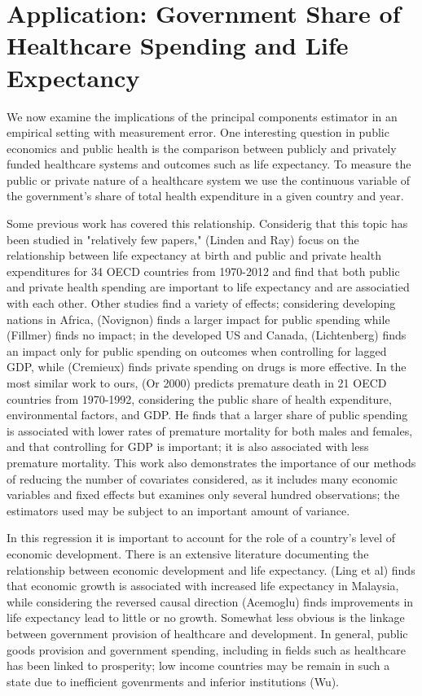 \documentclass[12pt]{article}
\begin{document}
    \section*{Application: Government Share of Healthcare Spending and Life Expectancy}

        We now examine the implications of the principal components estimator in an empirical setting with measurement error. One interesting question in public economics and public health is the comparison between publicly and privately funded healthcare systems and outcomes such as life expectancy. To measure the public or private nature of a healthcare system we use the continuous variable of the government's share of total health expenditure in a given country and year.

        Some previous work has covered this relationship. Considerig that this topic has been studied in "relatively few papers," (Linden and Ray) focus on the relationship between life expectancy at birth and public and private health expenditures for 34 OECD countries from 1970-2012 and find that both public and private health spending are important to life expectancy and are associatied with each other. Other studies find a variety of effects; considering developing nations in Africa, (Novignon) finds a larger impact for public spending while (Fillmer) finds no impact; in the developed US and Canada, (Lichtenberg) finds an impact only for public spending on outcomes when controlling for lagged GDP, while (Cremieux) finds private spending on drugs is more effective. In the most similar work to ours, (Or 2000) predicts premature death in 21 OECD countries from 1970-1992, considering the public share of health expenditure, environmental factors, and GDP. He finds that a larger share of public spending is associated with lower rates of premature mortality for both males and females, and that controlling for GDP is important; it is also associated with less premature mortality. This work also demonstrates the importance of our methods of reducing the number of covariates considered, as it includes many economic variables and fixed effects but examines only several hundred observations; the estimators used may be subject to an important amount of variance.

        In this regression it is important to account for the role of a country's level of economic development. There is an extensive literature documenting the relationship between economic development and life expectancy. (Ling et al) finds that economic growth is associated with increased life expectancy in Malaysia, while considering the reversed causal direction (Acemoglu) finds improvements in life expectancy lead to little or no growth. Somewhat less obvious is the linkage between government provision of healthcare and development. In general, public goods provision and government spending, including in fields such as healthcare has been linked to prosperity; low income countries may be remain in such a state due to inefficient govenrments and inferior institutions (Wu).
\end{document}
